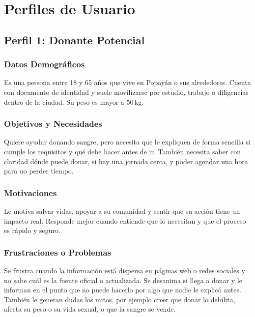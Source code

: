 \section{Perfiles de Usuario}

\subsection{Perfil 1: Donante Potencial}

\subsubsection{Datos Demográficos}
Es una persona entre 18 y 65 años que vive en Popayán o sus alrededores. Cuenta con documento de identidad y suele movilizarse por estudio, trabajo o diligencias dentro de la ciudad. Su peso es mayor a 50\,kg.

\subsubsection{Objetivos y Necesidades}
Quiere ayudar donando sangre, pero necesita que le expliquen de forma sencilla si cumple los requisitos y qué debe hacer antes de ir. También necesita saber con claridad dónde puede donar, si hay una jornada cerca, y poder agendar una hora para no perder tiempo.

\subsubsection{Motivaciones}
Le motiva salvar vidas, apoyar a su comunidad y sentir que su acción tiene un impacto real. Responde mejor cuando entiende que lo necesitan y que el proceso es rápido y seguro.

\subsubsection{Frustraciones o Problemas}
Se frustra cuando la información está dispersa en páginas web o redes sociales y no sabe cuál es la fuente oficial o actualizada. Se desanima si llega a donar y le informan en el punto que no puede hacerlo por algo que nadie le explicó antes. También le generan dudas los mitos, por ejemplo creer que donar lo debilita, afecta su peso o su vida sexual, o que la sangre se vende.

